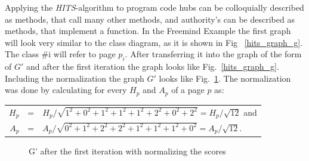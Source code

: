 Applying the \emph{HITS}-algorithm to program code hubs can be colloquially described as methods, that call many other methods, and authority's can be described as methods, that implement a function.\newline
In the Freemind Example the first graph will look very similar to the class diagram, as it is shown in Fig ~\ref{hits_graph_g}. The class \#i will refer to page $p_i$.
After transferring it into the graph of the form of $G'$ and after the first iteration the graph looks like Fig.~\ref{hits_graph_g}. \newline
Including the normalization the graph $G'$ looks like Fig.~\ref{hits_graph_after_first_iteration}. The normalization was done by calculating for every $H_p$ and $A_p$ of a page $p$ as:\newline
\begin{center}
  \begin{tabular}{ r c l }
    $H_p$ & = &$H_p / \sqrt{1^2+0^2+1^2+1^2+1^2+2^2+0^2+2^2} = H_p/ \sqrt{12}$ and \\
  $A_p$ & = &$ A_p / \sqrt{0^2+1^2+2^2+2^2+1^2+1^2+1^2+0^2} = A_p/ \sqrt{12}$. \\
  \end{tabular}
\end{center}  
  
\begin{figure}
  \centering
  \caption{G' after the first iteration with normalizing the scores}
  \label{hits_graph_after_first_iteration}
\end{figure}










































